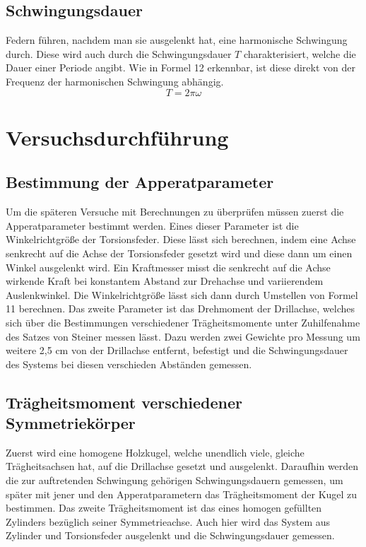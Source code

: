 \documentclass[titlepage = firstcover]{scrartcl}
\begin{document}
      \subsection{Schwingungsdauer}
      Federn führen, nachdem man sie ausgelenkt hat, eine harmonische Schwingung durch. Diese wird auch durch die Schwingungsdauer $T$ charakterisiert,
      welche die Dauer einer Periode angibt. Wie in Formel 12 erkennbar, ist diese direkt von der Frequenz der harmonischen Schwingung abhängig.
      \begin{equation}
        T = 2\pi \omega
      \end{equation}
    
    \section{Versuchsdurchführung}
      \subsection{Bestimmung der Apperatparameter}
      Um die späteren Versuche mit Berechnungen zu überprüfen müssen zuerst die Apperatparameter bestimmt werden. Eines dieser Parameter ist die Winkelrichtgröße 
      der Torsionsfeder. Diese lässt sich berechnen, indem eine Achse senkrecht auf die Achse der Torsionsfeder gesetzt wird und diese dann um einen Winkel
      ausgelenkt wird. Ein Kraftmesser misst die senkrecht auf die Achse wirkende Kraft bei konstantem Abstand zur Drehachse und variierendem Auslenkwinkel. Die 
      Winkelrichtgröße lässt sich dann durch Umstellen von Formel 11 berechnen. Das zweite Parameter ist das Drehmoment der Drillachse, welches sich über 
      die Bestimmungen verschiedener Trägheitsmomente unter Zuhilfenahme des Satzes von Steiner messen lässt. Dazu werden zwei Gewichte pro Messung um weitere 2,5 cm von 
      der  Drillachse entfernt, befestigt und die Schwingungsdauer des Systems bei diesen verschieden Abständen gemessen.

      \subsection{Trägheitsmoment verschiedener Symmetriekörper}
      Zuerst wird eine homogene Holzkugel, welche unendlich viele, gleiche Trägheitsachsen hat, auf die Drillachse gesetzt und ausgelenkt. Daraufhin werden die 
      zur auftretenden Schwingung gehörigen Schwingungsdauern gemessen, um später mit jener und den Apperatparametern das Trägheitsmoment der Kugel zu bestimmen.
      Das zweite Trägheitsmoment ist das eines homogen gefüllten Zylinders bezüglich seiner Symmetrieachse. Auch hier wird das System aus Zylinder und Torsionsfeder
      ausgelenkt und die Schwingungsdauer gemessen.
\end{document}
